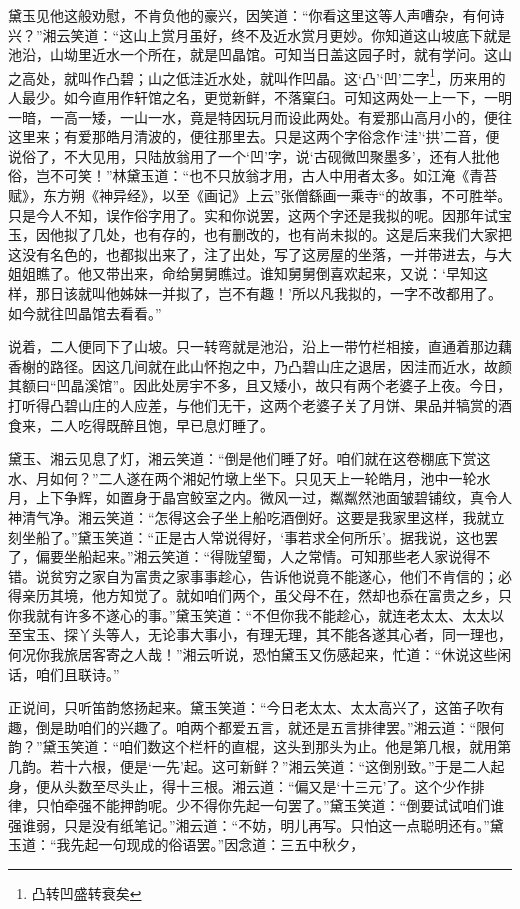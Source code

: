 \documentclass[12pt,oneside]{book}
\begin{document}
黛玉见他这般劝慰，不肯负他的豪兴，因笑道：“你看这里这等人声嘈杂，有何诗兴？”湘云笑道：“这山上赏月虽好，终不及近水赏月更妙。你知道这山坡底下就是池沿，山坳里近水一个所在，就是凹晶馆。可知当日盖这园子时，就有学问。这山之高处，就叫作凸碧；山之低洼近水处，就叫作凹晶。这‘凸’‘凹’二字\footnote{凸转凹盛转衰矣}，历来用的人最少。如今直用作轩馆之名，更觉新鲜，不落窠臼。可知这两处一上一下，一明一暗，一高一矮，一山一水，竟是特因玩月而设此两处。有爱那山高月小的，便往这里来；有爱那皓月清波的，便往那里去。只是这两个字俗念作‘洼’‘拱’二音，便说俗了，不大见用，只陆放翁用了一个‘凹’字，说‘古砚微凹聚墨多’，还有人批他俗，岂不可笑！”林黛玉道：“也不只放翁才用，古人中用者太多。如江淹《青苔赋》，东方朔《神异经》，以至《画记》上云”张僧繇画一乘寺“的故事，不可胜举。只是今人不知，误作俗字用了。实和你说罢，这两个字还是我拟的呢。因那年试宝玉，因他拟了几处，也有存的，也有删改的，也有尚未拟的。这是后来我们大家把这没有名色的，也都拟出来了，注了出处，写了这房屋的坐落，一并带进去，与大姐姐瞧了。他又带出来，命给舅舅瞧过。谁知舅舅倒喜欢起来，又说：‘早知这样，那日该就叫他姊妹一并拟了，岂不有趣！’所以凡我拟的，一字不改都用了。如今就往凹晶馆去看看。”

说着，二人便同下了山坡。只一转弯就是池沿，沿上一带竹栏相接，直通着那边藕香榭的路径。因这几间就在此山怀抱之中，乃凸碧山庄之退居，因洼而近水，故颜其额曰“凹晶溪馆”。因此处房宇不多，且又矮小，故只有两个老婆子上夜。今日，打听得凸碧山庄的人应差，与他们无干，这两个老婆子关了月饼、果品并犒赏的酒食来，二人吃得既醉且饱，早已息灯睡了。

黛玉、湘云见息了灯，湘云笑道：“倒是他们睡了好。咱们就在这卷棚底下赏这水、月如何？”二人遂在两个湘妃竹墩上坐下。只见天上一轮皓月，池中一轮水月，上下争辉，如置身于晶宫鲛室之内。微风一过，粼粼然池面皱碧铺纹，真令人神清气净。湘云笑道：“怎得这会子坐上船吃酒倒好。这要是我家里这样，我就立刻坐船了。”黛玉笑道：“正是古人常说得好，‘事若求全何所乐’。据我说，这也罢了，偏要坐船起来。”湘云笑道：“得陇望蜀，人之常情。可知那些老人家说得不错。说贫穷之家自为富贵之家事事趁心，告诉他说竟不能遂心，他们不肯信的；必得亲历其境，他方知觉了。就如咱们两个，虽父母不在，然却也忝在富贵之乡，只你我就有许多不遂心的事。”黛玉笑道：“不但你我不能趁心，就连老太太、太太以至宝玉、探丫头等人，无论事大事小，有理无理，其不能各遂其心者，同一理也，何况你我旅居客寄之人哉！”湘云听说，恐怕黛玉又伤感起来，忙道：“休说这些闲话，咱们且联诗。”

正说间，只听笛韵悠扬起来。黛玉笑道：“今日老太太、太太高兴了，这笛子吹有趣，倒是助咱们的兴趣了。咱两个都爱五言，就还是五言排律罢。”湘云道：“限何韵？”黛玉笑道：“咱们数这个栏杆的直棍，这头到那头为止。他是第几根，就用第几韵。若十六根，便是‘一先’起。这可新鲜？”湘云笑道：“这倒别致。”于是二人起身，便从头数至尽头止，得十三根。湘云道：“偏又是‘十三元’了。这个少作排律，只怕牵强不能押韵呢。少不得你先起一句罢了。”黛玉笑道：“倒要试试咱们谁强谁弱，只是没有纸笔记。”湘云道：“不妨，明儿再写。只怕这一点聪明还有。”黛玉道：“我先起一句现成的俗语罢。”因念道：三五中秋夕，
\end{document}
